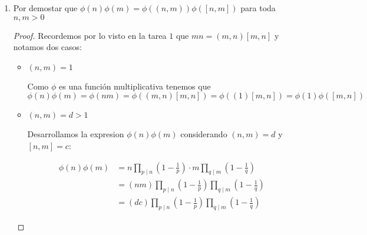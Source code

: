 \documentclass[12pt]{article}
\begin{document}
\begin{enumerate}
\begin{proof}
            
            \begin{align*}
                 \sum_{k=1}^n k &= r_1 + r_2 + \dots + r_{\frac{\phi(n)}{2}} + n - r_1 + n - r_2 + \dots + n - r_{\frac{\phi(n)}{2}} \\
                                &= (r_1 + n - r_1) + (r_2 + n - r_2) + \dots + (r_{\frac{\phi(n)}{2}} + n - r_{\frac{\phi(n)}{2}}) \\
                                &= (n + r_1 - r_1) + (n + r_2 - r_2) + \dots + (n + r_{\frac{\phi(n)}{2}} - r_{\frac{\phi(n)}{2}}) \\
                                &= n(\frac{\phi(n)}{2}) \\
                                &= \frac{n}{2} \phi(n)
            \end{align*}
            
            \end{proof}
            
            
            
            \item Por demostar que $\phi(n)\phi(m) = \phi((n,m)) \phi([n,m])$ para toda $n,m > 0$
            
            \begin{proof}
            
            Recordemos por lo visto en la tarea $1$ que $mn = (m,n)[m,n]$ y notamos dos casos:
            
            \begin{itemize}
                \item $(n,m) = 1$
                
                Como $\phi$ es una función multiplicativa tenemos que $\phi(n) \phi(m) = \phi(nm) = \phi((m,n)[m,n]) = \phi((1)[m,n]) = \phi(1) \phi([m,n])$
                
                
                \item $(n,m) = d > 1$
                
                Desarrollamos la expresion $\phi(n) \phi(m)$ considerando $(n,m) = d$ y $[n,m] = c$: 
                
                
                \begin{align*}
                    \phi(n) \phi(m) &= n \prod_{p \mid n} (1 - \frac{1}{p}) \cdot m \prod_{q \mid m} (1 - \frac{1}{q}) \\
                                    &= (nm) \prod_{p \mid n} (1 - \frac{1}{p}) \prod_{q \mid m} (1 - \frac{1}{q}) \\
                                    &= (dc) \prod_{p \mid n} (1 - \frac{1}{p}) \prod_{q \mid m} (1 - \frac{1}{q})
                \end{align*}
                

\end{itemize}
\end{proof}
\end{enumerate}
\end{document}
